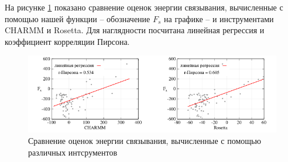На рисунке \ref{third} показано сравнение оценок энергии связывания, вычисленные с помощью нашей функции -- обозначение $F_s$ на графике -- и инструментами CHARMM и Rosetta. Для наглядности посчитана линейная регрессия и коэффициент корреляции Пирсона.

\begin{figure}[h!]
	\centering
	\includegraphics[width=1.0\linewidth]{images/third.pdf}
	\caption{Сравнение оценок энергии связывания, вычисленные с помощью различных интсрументов}
	\label{third}
\end{figure}
